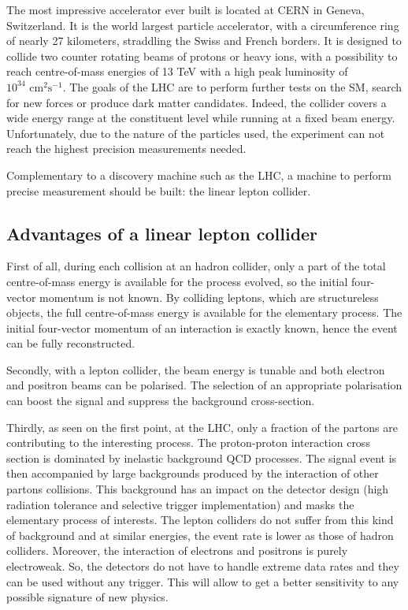   The most impressive accelerator ever built is located at CERN in Geneva, Switzerland. 
  It is the world largest particle accelerator, with a circumference ring of nearly 27 kilometers, straddling the Swiss and French borders.
  It is designed to collide two counter rotating beams of protons or heavy ions, with a possibility to reach centre-of-mass energies of 13 TeV with a high peak luminosity of $10^{34} \text{ cm}^2 \text{s}^{-1}$.
  The goals of the \gls{LHC} are to perform further tests on the SM, search for new forces or produce dark matter candidates. 
  Indeed, the collider covers a wide energy range at the constituent level while running at a fixed beam energy.
  Unfortunately, due to the nature of the particles used, the experiment can not reach the highest precision measurements needed.
  
  Complementary to a discovery machine such as the \gls{LHC}, a machine to perform precise measurement should be built: the linear lepton collider.

    \subsection{Advantages of a linear lepton collider}
    \label{subsec:advLLC}
    
    First of all, during each collision at an hadron collider, only a part of the total centre-of-mass energy is available for the process evolved, so the initial four-vector momentum is not known. 
    By colliding leptons, which are structureless objects, the full centre-of-mass energy is available for the elementary process. 
    The initial four-vector momentum of an interaction is exactly known, hence the event can be fully reconstructed.

    Secondly, with a lepton collider, the beam energy is tunable and both electron and positron beams can be polarised. 
    The selection of an appropriate polarisation can boost the signal and suppress the background cross-section. 

    Thirdly, as seen on the first point, at the \gls{LHC}, only a fraction of the partons are contributing to the interesting process. 
    The proton-proton interaction cross section is dominated by inelastic background QCD processes.
    The signal event is then accompanied by large backgrounds produced by the interaction of other partons collisions.
    This background has an impact on the detector design (high radiation tolerance and selective trigger implementation) and masks the elementary process of interests. 
    The lepton colliders do not suffer from this kind of background and at similar energies, the event rate is lower as those of hadron colliders.
    Moreover, the interaction of electrons and positrons is purely electroweak.
    So, the detectors do not have to handle extreme data rates and they can be used without any trigger.
    This will allow to get a better sensitivity to any possible signature of new physics.

